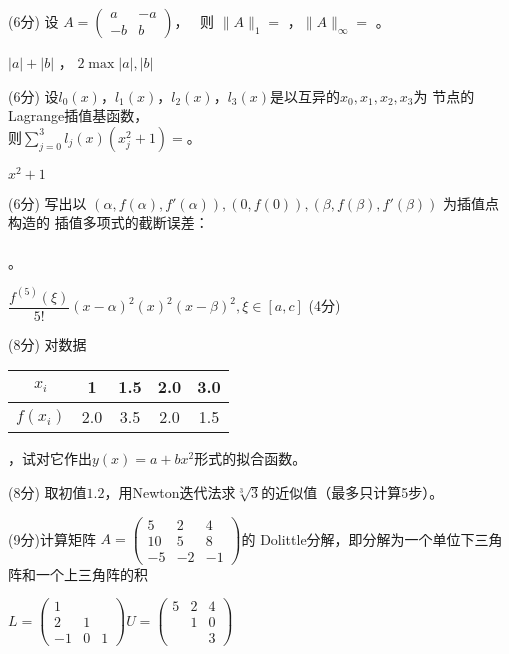 \documentclass[12pt,letter]{ustcexam}
\def\ds{\displaystyle}
\begin{document}
\begin{CJK*}{UTF8}{song}
\begin{problems}
\qu (6分) 设 $ \ds{A=\begin {pmatrix} a & -a \\ -b & b \end {pmatrix}}$，
\ 则 $ \|A\|_1=$ \sixb ，$\|A\|_{\infty}=$ \sixb 。
\begin{sol}
 $|a|+|b|$ ， $2\max{|a|,|b|}$ 
\end{sol}

\qu (6分) 设$l_0(x)$，$l_1(x)$，$l_2(x)$，$l_3(x)$是以互异的$x_0,x_1,x_2,x_3$为
节点的Lagrange插值基函数，\\
则$\displaystyle \sum_{j=0}^{3}l_j(x)(x_j^2+1)=$\sixb。
\begin{sol}
$ x^2+1 $ 
\end{sol}

\qu (6分) 写出以 $ (\alpha,f(\alpha),f'(\alpha)),(0,f(0)),
(\beta,f(\beta),f'(\beta)) $ 为插值点构造的
插值多项式的截断误差： \\ \\ \tenb\tenb\tenb 。
\begin{sol}
$\dfrac{f^{(5)}(\xi)}{5!}(x-\alpha)^2(x)^2(x-\beta)^2 , \xi\in[a,c]$ (4分)
\end{sol}

\newpage
{}
\qu (8分) 对数据 
\begin{tabular}{c|cccc} $x_i$  & 1 & 1.5 & 2.0 & 3.0
\\\hline $f(x_i)$ & 2.0 & 3.5 & 2.0 & 1.5
\end{tabular} ，试对它作出$y(x)=a+b x^2$形式的拟合函数。

\vspace*{0.4\textheight}

\qu (8分) 取初值$1.2$，用Newton迭代法求$\sqrt[3]{3}$的近似值（最多只计算5步）。


\newpage
\qu (9分)计算矩阵
$A=\begin{pmatrix} 5 & 2 & 4 \\ 10 & 5 & 8 \\ -5 & -2 & -1 \end{pmatrix}$的
Dolittle分解，即分解为一个单位下三角阵和一个上三角阵的积
\begin{sol}
$
L=
\left(\begin{array}{ccc}
1 &  &  \\
2 & 1 &  \\
-1 & 0 & 1
\end{array}\right)
U=
\left(\begin{array}{ccc}
5 & 2 & 4 \\
 & 1 & 0 \\
 &  & 3
\end{array}\right) 
$
\end{sol}


\end{problems}
\end{CJK*}
\end{document}
